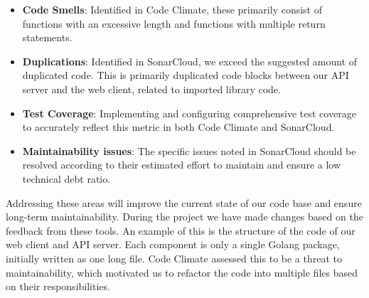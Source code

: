 \begin{itemize}
    \item \textbf{Code Smells}: Identified in Code Climate, these primarily consist of functions with an excessive length and functions with multiple return statements. 
    \item \textbf{Duplications}: Identified in SonarCloud, we exceed the suggested amount of duplicated code. This is primarily duplicated code blocks between our API server and the web client, related to imported library code.
    \item \textbf{Test Coverage}: Implementing and configuring comprehensive test coverage to accurately reflect this metric in both Code Climate and SonarCloud.
    \item \textbf{Maintainability issues}: The specific issues noted in SonarCloud should be resolved according to their estimated effort to maintain and ensure a low technical debt ratio.
\end{itemize}

Addressing these areas will improve the current state of our code base and ensure long-term maintainability. 
During the project we have made changes based on the feedback from these tools. 
An example of this is the structure of the code of our web client and API server. 
Each component is only a single Golang package, initially written as one long file. 
Code Climate assessed this to be a threat to maintainability, which motivated us to refactor the code into multiple files based on their responsibilities.

